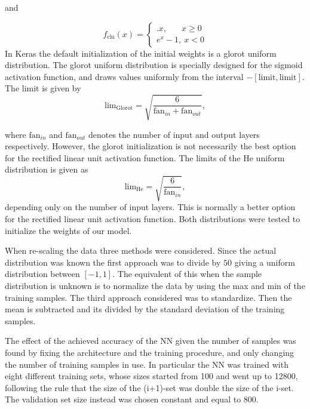 \documentclass[prl,twocolumn]{revtex4-1}
\begin{document}
\begin{center}
and
\end{center}
\begin{equation}
    f_\textrm{elu}(x) = \begin{cases}.
    x, \ \ \ \ \ \ \ \, x \geq 0\\
    e^x -1, \ x < 0
    \end{cases}
    \label{eq:elu}
\end{equation}
In Keras the default initialization of the initial weights is a glorot uniform distribution. The glorot uniform distribution is specially designed for the sigmoid activation function, and draws values uniformly from the interval $-[\textrm{limit},\textrm{limit}]$. The limit is given by 
\begin{equation}
    \textrm{lim}_\textrm{Glorot} = \sqrt{\frac{6}{\textrm{fan}_{in}+\textrm{fan}_{out}}},
\end{equation}

where $\textrm{fan}_{in}$ and $\textrm{fan}_{out}$ denotes the number of input and output layers respectively. However, the glorot initialization is not necessarily the best option for the rectified linear unit activation function. The limits of the He uniform distribution is given as
\begin{equation}
    \textrm{lim}_\textrm{He} = \sqrt{\frac{6}{\textrm{fan}_{in}}},
\end{equation}
depending only on the number of input layers. This is normally a better option for the rectified linear unit activation function. Both distributions were tested to initialize the weights of our model.

When re-scaling the data three methods were considered. Since the actual distribution was known the first approach was to divide by $50$ giving a uniform distribution between $[-1,1]$. The equivalent of this when the sample distribution is unknown is to normalize the data by using the max and min of the training samples. The third approach considered was to standardize. Then the mean is subtracted and its divided by the standard deviation of the training samples.


The effect of the achieved accuracy of the NN given the number of samples was found by fixing the architecture and the training procedure, and only changing the number of training samples in use. In particular the NN was trained with eight different training sets, whose sizes started from 100 and went up to 12800, following the rule that the size of the (i+1)-set was double the size of the i-set.
The validation set size instead was chosen constant and equal to 800.
\end{document}
